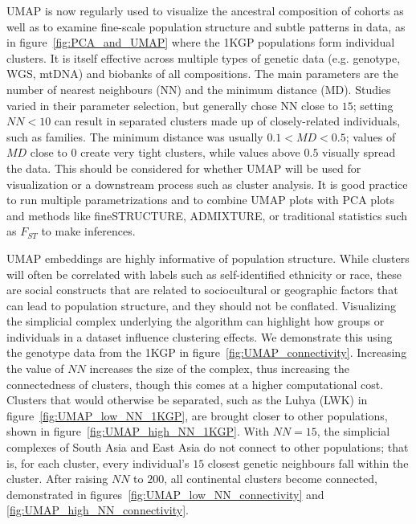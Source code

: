 \documentclass[12pt]{article}
\begin{document}
UMAP is now regularly used to visualize the ancestral composition of cohorts as well as to examine fine-scale population structure and subtle patterns in data, as in figure~\ref{fig:PCA_and_UMAP} where the 1KGP populations form individual clusters. It is itself effective across multiple types of genetic data (e.g. genotype, WGS, mtDNA) and biobanks of all compositions. The main parameters are the number of nearest neighbours (NN) and the minimum distance (MD). Studies varied in their parameter selection, but generally chose NN close to $15$; setting $NN < 10$ can result in separated clusters made up of closely-related individuals, such as families. The minimum distance was usually $0.1 < MD < 0.5$; values of $MD$ close to $0$ create very tight clusters, while values above $0.5$ visually spread the data. This should be considered for whether UMAP will be used for visualization or a downstream process such as cluster analysis. It is good practice to run multiple parametrizations and to combine UMAP plots with PCA plots and methods like fineSTRUCTURE\cite{lawson2012inference}, ADMIXTURE\cite{alexander2009fast}, or traditional statistics such as $F_{ST}$ to make inferences.

UMAP embeddings are highly informative of population structure. While clusters will often be correlated with labels such as self-identified ethnicity or race, these are social constructs that are related to sociocultural or geographic factors that can lead to population structure, and they should not be conflated. Visualizing the simplicial complex underlying the algorithm can highlight how groups or individuals in a dataset influence clustering effects. We demonstrate this using the genotype data from the 1KGP in figure~\ref{fig:UMAP_connectivity}. Increasing the value of $NN$ increases the size of the complex, thus increasing the connectedness of clusters, though this comes at a higher computational cost. Clusters that would otherwise be separated, such as the Luhya (LWK) in figure~\ref{fig:UMAP_low_NN_1KGP}, are brought closer to other populations, shown in figure~\ref{fig:UMAP_high_NN_1KGP}. With $NN=15$, the simplicial complexes of South Asia and East Asia do not connect to other populations; that is, for each cluster, every individual's $15$ closest genetic neighbours fall within the cluster. After raising $NN$ to $200$, all continental clusters become connected, demonstrated in figures~\ref{fig:UMAP_low_NN_connectivity} and \ref{fig:UMAP_high_NN_connectivity}.  
\end{document}

